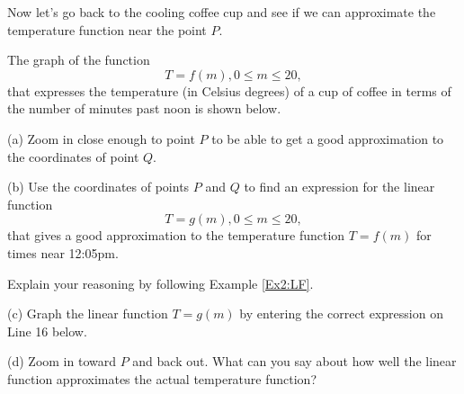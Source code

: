 \documentclass{ximera}
\begin{document}
Now let's go back to the cooling coffee cup and see if we can approximate the temperature function near the point $P$.

\begin{example} \label{Ex3:LF} The graph of the function
\[
    T = f(m) , 0\leq m \leq 20 ,
\]
that expresses the temperature (in Celsius degrees) of a cup of coffee in terms of the number of minutes past noon is shown below. 

\begin{exploration}\label{Exp1:LF}

(a) Zoom in close enough to point $P$ to be able to get a good approximation to the coordinates of point $Q$. 

(b) Use the coordinates of points $P$ and $Q$ to find an expression for the linear function 
\[
  T = g(m) , 0\leq m \leq 20,
\]
that gives a good approximation to the temperature function $T=f(m)$ for times near 12:05pm. 

Explain your reasoning by following Example \ref{Ex2:LF}.

(c) Graph the linear function $T=g(m)$ by entering the correct expression on Line 16 below.

(d) Zoom in toward $P$ and back out. What can you say about how well the linear function approximates the actual temperature function?

 
\begin{onlineOnly}
    \begin{center}
\end{center}
\end{onlineOnly}
\end{exploration}

\end{example} 
\end{document}

